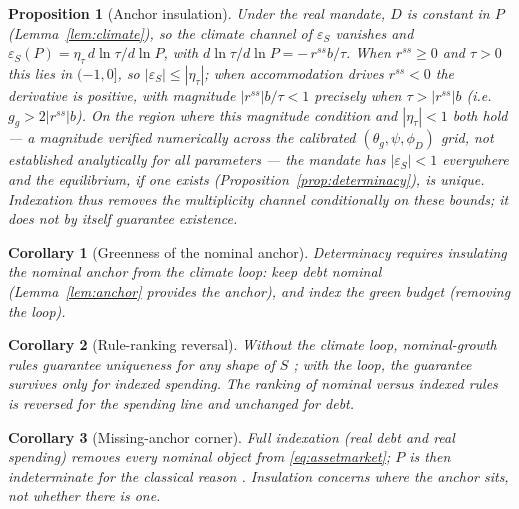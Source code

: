 \documentclass[12pt]{article}
\newtheorem{proposition}{Proposition}
\newtheorem{corollary}{Corollary}
\newcommand{\Sfun}{S}
\begin{document}
\begin{proposition}[Anchor insulation]\label{prop:insulation}
Under the real mandate, $D$ is constant in $P$ (Lemma~\ref{lem:climate}), so
the climate channel of $\varepsilon_S$ vanishes and
$\varepsilon_S(P) = \eta_\tau\, d\ln\tau/d\ln P$, with
$d\ln\tau/d\ln P = -\,r^{ss}b/\tau$. When $r^{ss}\ge0$ and $\tau>0$ this
lies in $(-1,0]$, so $|\varepsilon_S|\le|\eta_\tau|$; when accommodation
drives $r^{ss}<0$ the derivative is positive, with magnitude
$|r^{ss}|b/\tau<1$ precisely when $\tau>|r^{ss}|b$ (i.e.\ $g_g>2|r^{ss}|b$).
On the region where this magnitude condition and $|\eta_\tau|<1$ both hold
--- a magnitude verified numerically across the calibrated
$(\theta_g,\psi,\phi_D)$ grid, not established analytically for all
parameters --- the mandate has $|\varepsilon_S|<1$ everywhere and the
equilibrium, \emph{if one exists} (Proposition~\ref{prop:determinacy}), is
unique. Indexation thus removes the multiplicity channel conditionally on
these bounds; it does not by itself guarantee existence.
\end{proposition}

\begin{corollary}[Greenness of the nominal anchor]\label{cor:anchor}
Determinacy requires insulating the nominal anchor from the climate loop:
keep \emph{debt} nominal (Lemma~\ref{lem:anchor} provides the anchor), and
\emph{index} the green budget (removing the loop).
\end{corollary}

\begin{corollary}[Rule-ranking reversal]\label{cor:reversal}
Without the climate loop, nominal-growth rules guarantee uniqueness for any
shape of $\Sfun$ \citep{hagedorn2026dtpl}; with the loop, the guarantee
survives only for indexed spending. The ranking of nominal versus indexed
rules is reversed for the spending line and unchanged for debt.
\end{corollary}

\begin{corollary}[Missing-anchor corner]\label{cor:sargentwallace}
Full indexation (real debt \emph{and} real spending) removes every nominal
object from \eqref{eq:assetmarket}; $P$ is then indeterminate for the
classical reason \citep{sargentwallace1975}. Insulation concerns \emph{where}
the anchor sits, not whether there is one.
\end{corollary}
\end{document}
